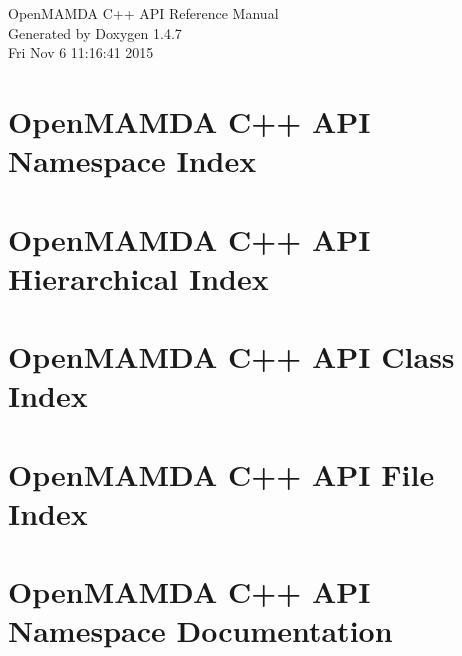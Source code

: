 \documentclass[a4paper]{book}
\begin{document}
\begin{titlepage}
\vspace*{7cm}
\begin{center}
{\Large Open\-MAMDA C++ API Reference Manual}\\
\vspace*{1cm}
{\large Generated by Doxygen 1.4.7}\\
\vspace*{0.5cm}
{\small Fri Nov 6 11:16:41 2015}\\
\end{center}
\end{titlepage}
\clearemptydoublepage
{}
\tableofcontents
\clearemptydoublepage
{}
\chapter{Open\-MAMDA C++ API Namespace Index}

\chapter{Open\-MAMDA C++ API Hierarchical Index}

\chapter{Open\-MAMDA C++ API Class Index}

\chapter{Open\-MAMDA C++ API File Index}

\chapter{Open\-MAMDA C++ API Namespace Documentation}

\end{document}
